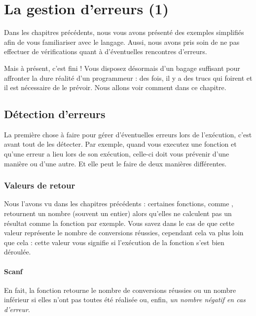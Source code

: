 \chapter{La gestion d'erreurs (1)}
\label{la-gestion-erreurs-(1)}

Dans les chapitres précédents, nous vous avons présenté des exemples simplifiés afin de
vous familiariser avec le langage. Aussi, nous avons pris soin de ne pas
effectuer de vérifications quant à d'éventuelles rencontres d'erreurs.

Mais à présent, c'est fini ! Vous disposez désormais d'un bagage
suffisant pour affronter la dure réalité d'un programmeur : des fois, il
y a des trucs qui foirent et il est nécessaire de le prévoir. Nous
allons voir comment dans ce chapitre.

\section{Détection d'erreurs}
\label{detection-derreurs}

La première chose à faire pour gérer d'éventuelles erreurs lors de l'exécution, c'est avant tout de les
détecter. Par exemple, quand vous executez une fonction et qu'une erreur
a lieu lors de son exécution, celle-ci doit vous prévenir d'une manière
ou d'une autre. Et elle peut le faire de deux manières différentes.

\subsection{Valeurs de retour}
\label{valeurs-de-retour}

Nous l'avons vu dans les chapitres précédents : certaines fonctions,
comme , retournent un nombre (souvent un entier) alors
qu'elles ne calculent pas un résultat comme la fonction 
par exemple. Vous savez dans le cas de  que cette valeur
représente le nombre de conversions réussies, cependant cela va plus
loin que cela : cette valeur vous signifie si l'exécution de la fonction
s'est bien déroulée.

\subsubsection{Scanf}
\label{scanf}

En fait, la fonction  retourne le nombre de conversions
réussies ou un nombre inférieur si elles n'ont pas toutes été réalisée
ou, enfin, \emph{un nombre négatif en cas d'erreur}.

